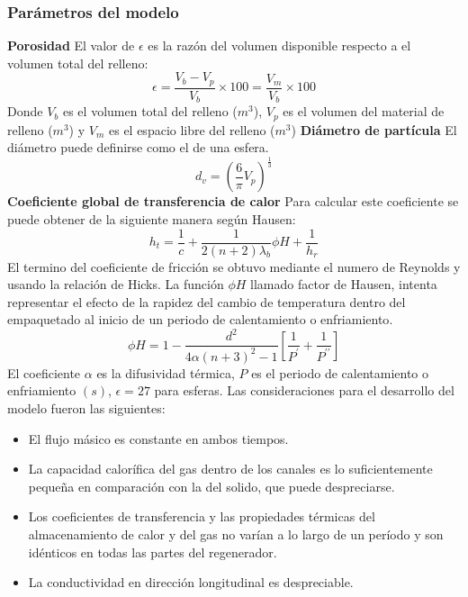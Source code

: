 \documentclass[12pt,letterpaper,final]{article}%
\begin{document}
\subsubsection*{Parámetros del modelo}
\textbf{Porosidad}
\newline
El valor de $\epsilon$ es la razón del volumen disponible respecto a el volumen total del relleno:
\begin{equation}
	\epsilon = \frac{V_b -V_p}{V_b} \times 100 = \frac{V_m}{V_b} \times 100
\end{equation}
Donde $V_b$ es el volumen total del relleno ($m^3$), $V_p$ es el volumen del material de relleno ($m^3$) y $V_m$ es el espacio libre del relleno ($m^3$)
\newline
\textbf{Diámetro de partícula}
\newline
El diámetro puede definirse como el de una esfera.
\begin{equation}
	d_v=(\frac{6}{\pi}V_p)^{\frac{1}{3}}
\end{equation}
\textbf{Coeficiente global de transferencia de calor}
\newline
Para calcular este coeficiente se puede obtener de la siguiente manera según Hausen\cite{Hausen1976}:
\begin{equation}
	h_t= \frac{1}{c} + \frac{1}{2(n+2)\lambda_b}\phi H + \frac{1}{h_r}
\end{equation}
El termino del coeficiente de fricción se obtuvo mediante el numero de Reynolds y usando la relación de Hicks\cite{Hicks1970}.
\newline
La función $\phi H$ llamado factor de Hausen, intenta representar el efecto de la rapidez del cambio de temperatura dentro del empaquetado al inicio de un periodo de calentamiento o enfriamiento\cite{HINCHCLIFFE1981}.
\begin{equation}
	\phi H = 1 - \frac{d^2}{4 \alpha (n + 3)^2 - 1}  [\frac{1}{P^\prime} + \frac{1}{P^{\prime\prime}}]
\end{equation}
El coeficiente $\alpha$ es la difusividad térmica, $P$ es el periodo de calentamiento o enfriamiento $(s)$, $\epsilon =27$ para esferas.
\newline
Las consideraciones para el desarrollo del modelo fueron las siguientes:
\begin{itemize}
	\item El flujo másico es constante en ambos tiempos.
	\item La capacidad calorífica del gas dentro de los canales es lo suficientemente pequeña en comparación con la del solido, que puede despreciarse.
	\item Los coeficientes de transferencia y las propiedades térmicas del almacenamiento de calor y del gas no varían a lo largo de un período y son idénticos en todas las partes del regenerador.
	\item La conductividad en dirección longitudinal es despreciable. 
\end{itemize}
\end{document}
